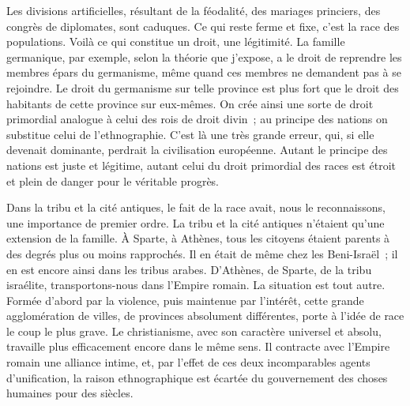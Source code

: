 \documentclass[french,twoside]{book} %
\newcommand\orgName[1]{#1}
\newcommand\placeName[1]{#1}
\begin{document}
\noindent Les divisions artificielles, résultant de la féodalité, des mariages princiers, des congrès de diplomates, sont caduques. Ce qui reste ferme et fixe, c’est la race des populations. Voilà ce qui constitue un droit, une légitimité. La famille germanique, par exemple, selon la théorie que j’expose, a le droit de reprendre les membres épars du germanisme, même quand ces membres ne demandent pas à se rejoindre. Le droit du germanisme sur telle province est plus fort que le droit des habitants de cette province sur eux-mêmes. On crée ainsi une sorte de droit primordial analogue à celui des rois de droit divin ; au principe des nations on substitue celui de l’ethnographie. C’est là une très grande erreur, qui, si elle devenait dominante, perdrait la civilisation européenne. Autant le principe des nations est juste et légitime, autant celui du droit primordial des races est étroit et plein de danger pour le véritable progrès.\par
Dans la tribu et la cité antiques, le fait de la race avait, nous le reconnaissons, une importance de premier ordre. La tribu et la cité antiques n’étaient qu’une extension de la famille. À {\placeName Sparte}, à {\placeName Athènes}, tous les citoyens étaient parents à des degrés plus ou moins rapprochés. Il en était de même chez les {\orgName Beni-Israël} ; il en est encore ainsi dans les {\orgName tribus arabes}. D’{\placeName Athènes}, de {\placeName Sparte}, de la {\orgName tribu israélite}, transportons-nous dans l’{\orgName Empire romain}. La situation est tout autre. Formée d’abord par la violence, puis maintenue par l’intérêt, cette grande agglomération de villes, de provinces absolument différentes, porte à l’idée de race le coup le plus grave. Le christianisme, avec son caractère universel et absolu, travaille plus efficacement encore dans le même sens. Il contracte avec l’{\orgName Empire romain} une alliance intime, et, par l’effet de ces deux incomparables agents d’unification, la raison ethnographique est écartée du gouvernement des choses humaines pour des siècles.\par
\end{document}
